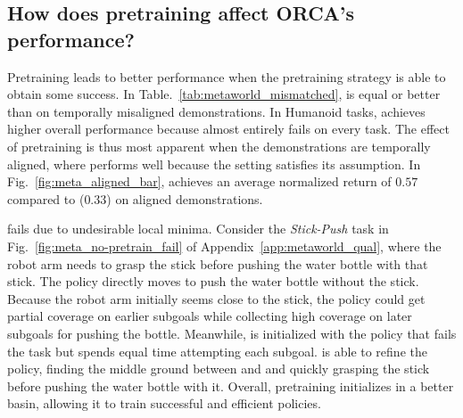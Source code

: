 \subsection{How does pretraining affect ORCA's performance?}
Pretraining leads to better \orca{} performance when the pretraining strategy is able to obtain some success. In Table.~\ref{tab:metaworld_mismatched}, \orca{} is equal or better than \orcanp{} on temporally misaligned demonstrations. In Humanoid tasks, \orcanp{} achieves higher overall performance because \tot{} almost entirely fails on every task. The effect of pretraining is thus most apparent when the demonstrations are temporally aligned, where \tot{} performs well because the setting satisfies its assumption. 
In Fig.~\ref{fig:meta_aligned_bar}, \orca{} achieves an average normalized return of $0.57$ compared to \orcanp{} ($0.33$) on aligned demonstrations.

\orcanp{} fails due to undesirable local minima.
Consider the \textit{Stick-Push} task in Fig.~\ref{fig:meta_no-pretrain_fail} of Appendix~\ref{app:metaworld_qual}, where the robot arm needs to grasp the stick before pushing the water bottle with that stick.
The \orcanp{} policy directly moves to push the water bottle without the stick.
Because the robot arm initially seems close to the stick, the \orcanp{} policy could get partial coverage on earlier subgoals while collecting high coverage on later subgoals for pushing the bottle. 
Meanwhile, \orca{} is initialized with the \tot{} policy that fails the task but spends equal time attempting each subgoal.
\orca{} is able to refine the policy, finding the middle ground between \orcanp{} and \tot{}and quickly grasping the stick before pushing the water bottle with it. 
Overall, pretraining initializes \orca{} in a better basin, allowing it to train successful and efficient policies.